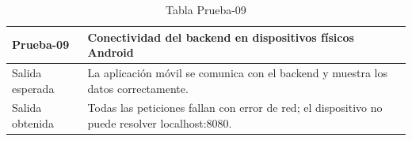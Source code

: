 \begin{table}[H]
\centering
\begin{tabular}{|p{}|p{}|}
\hline
\textbf{Prueba-09} & \textbf{Conectividad del backend en dispositivos físicos Android} \\ \hline
Salida esperada & La aplicación móvil se comunica con el backend y muestra los datos correctamente. \\ \hline
Salida obtenida & Todas las peticiones fallan con error de red; el dispositivo no puede resolver localhost:8080. \\ \hline
\end{tabular}
\caption{Tabla Prueba-09}
\label{tab:prueba09}
\end{table}
